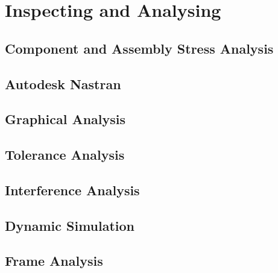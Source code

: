 \section{Inspecting and Analysing}

\subsection{Component and Assembly Stress Analysis}

\subsection{Autodesk Nastran}

\subsection{Graphical Analysis}

\subsection{Tolerance Analysis}

\subsection{Interference Analysis}

\subsection{Dynamic Simulation}

\subsection{Frame Analysis}